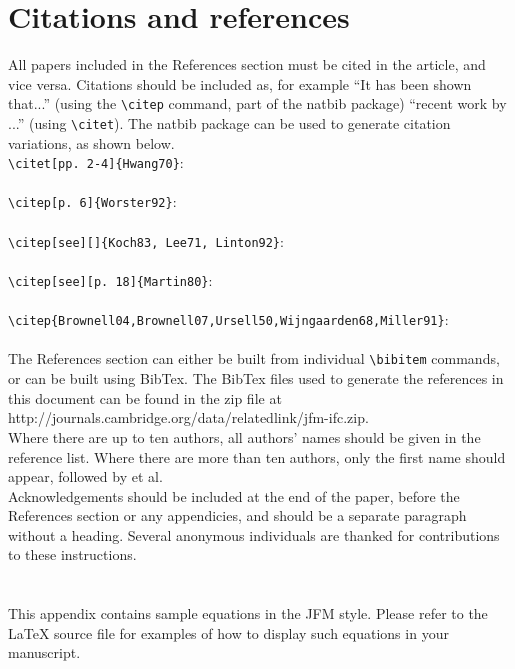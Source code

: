 \documentclass{jfm}
\begin{document}
\section{Citations and references}
All papers included in the References section must be cited in the article, and vice versa. Citations should be included as, for example ``It has been shown \citep{Rogallo81} that...'' (using the \verb|\citep| command, part of the natbib package) ``recent work by \citet{Dennis85}...'' (using \verb|\citet|).
The natbib package can be used to generate citation variations, as shown below.\\
\verb#\citet[pp. 2-4]{Hwang70}#:\\
\citet[pp. 2-4]{Hwang70} \\
\verb#\citep[p. 6]{Worster92}#:\\
\citep[p. 6]{Worster92}\\
\verb#\citep[see][]{Koch83, Lee71, Linton92}#:\\
\citep[see][]{Koch83, Lee71, Linton92}\\
\verb#\citep[see][p. 18]{Martin80}#:\\
\citep[see][p. 18]{Martin80}\\
\verb#\citep{Brownell04,Brownell07,Ursell50,Wijngaarden68,Miller91}#:\\
\citep{Brownell04,Brownell07,Ursell50,Wijngaarden68,Miller91}\\
The References section can either be built from individual \verb#\bibitem# commands, or can be built using BibTex. The BibTex files used to generate the references in this document can be found in the zip file at http://journals.cambridge.org/\linebreak[3]data/\linebreak[3]relatedlink/\linebreak[3]jfm-ifc.zip.\\
Where there are up to ten authors, all authors' names should be given in the reference list. Where there are more than ten authors, only the first name should appear, followed by et al.\\

Acknowledgements should be included at the end of the paper, before the References section or any appendicies, and should be a separate paragraph without a heading. Several anonymous individuals are thanked for contributions to these instructions.

\appendix
\section{}\label{appA}
This appendix contains sample equations in the JFM style. Please refer to the {\LaTeX} source file for examples of how to display such equations in your manuscript.
\end{document}
